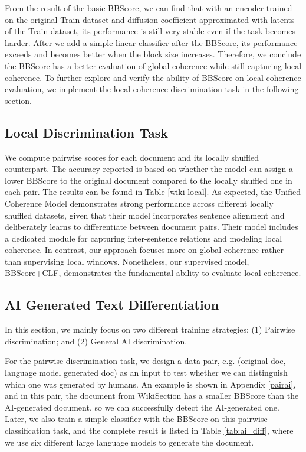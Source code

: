 \documentclass[letterpaper]{article} %
\begin{document}
From the result of the basic BBScore, we can find that with an encoder trained on the original Train dataset and diffusion coefficient approximated with latents of the Train dataset, its performance is still very stable even if the task becomes harder. After we add a simple linear classifier after the BBScore, its performance exceeds \cite{moon-etal-2019-unified} and becomes better when the block size increases. Therefore, we conclude the BBScore has a better evaluation of global coherence while still capturing local coherence. To further explore and verify the ability of BBScore on local coherence evaluation, we implement the local coherence discrimination task in the following section. 



\subsection{Local Discrimination Task}
We compute pairwise scores for each document and its locally shuffled counterpart. The accuracy reported is based on whether the model can assign a lower BBScore to the original document compared to the locally shuffled one in each pair. The results can be found in Table \ref{wiki-local}. As expected, the Unified Coherence Model \citep{moon-etal-2019-unified} demonstrates strong performance across different locally shuffled datasets, given that their model incorporates sentence alignment and deliberately learns to differentiate between document pairs. Their model includes a dedicated module for capturing inter-sentence relations and modeling local coherence. In contrast, our approach focuses more on global coherence rather than supervising local windows. Nonetheless, our supervised model, BBScore+CLF, demonstrates the fundamental ability to evaluate local coherence.




\subsection{AI Generated Text Differentiation}
In this section, we mainly focus on two different training strategies: (1) Pairwise discrimination; and (2) General AI discrimination. 

For the pairwise discrimination task, we design a data pair, e.g. (original doc, language model generated doc) as an input to test whether we can distinguish which one was generated by humans. 
An example is shown in Appendix \ref{pairai}, and in this pair, the document from WikiSection has a smaller BBScore than the AI-generated document, so we can successfully detect the AI-generated one. Later, we also train a simple classifier with the BBScore on this pairwise classification task, and the complete result is listed in Table \ref{tab:ai_diff}, where we use six different large language models to generate the document.
\end{document}
